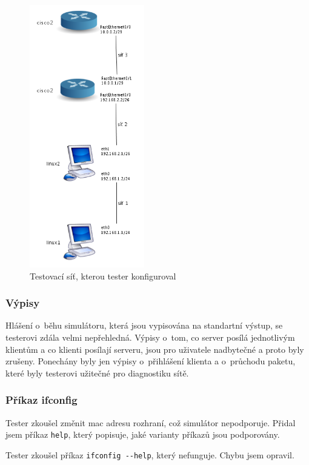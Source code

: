 \begin{figure}[h]
\begin{center}
\includegraphics[width=5cm]{obrazky/testovani}
\caption{Testovací síť, kterou tester konfiguroval}
\label{obr_testovani}
\end{center}
\end{figure}

\subsubsection{Výpisy}

Hlášení o~běhu simulátoru, která jsou vypisována na standartní výstup, se testerovi zdála velmi nepřehledná. Výpisy o~tom, co server posílá jednotlivým klientům a co klienti posílají serveru, jsou pro uživatele nadbytečné a proto byly zrušeny. Ponechány byly jen výpisy o~přihlášení klienta a o~průchodu paketu, které byly testerovi užitečné pro diagnostiku sítě.

\subsubsection{Příkaz ifconfig}

Tester zkoušel změnit mac adresu rozhraní, což simulátor nepodporuje. Přidal jsem příkaz \verb|help|, který popisuje, jaké varianty příkazů jsou podporovány.

Tester zkoušel příkaz \verb|ifconfig --help|, který nefunguje. Chybu jsem opravil.

